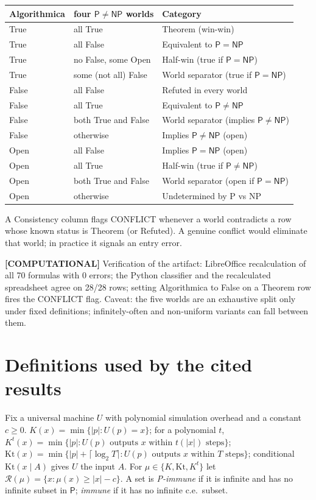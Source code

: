 \documentclass[11pt]{article}
\theoremstyle{remark}
\newcommand{\Kt}{\mathrm{Kt}}
\newcommand{\Kpt}{K^{t}}
\newcommand{\R}{\mathcal{R}}
\newcommand{\cP}{\mathsf{P}}
\newcommand{\NP}{\mathsf{NP}}
\newcommand{\status}[1]{\textbf{[#1]}}
\begin{document}
\begin{center}
\begin{tabular}{lll}
Algorithmica & four $\cP\neq\NP$ worlds & Category \\ \hline
True & all True & Theorem (win-win) \\
True & all False & Equivalent to $\cP=\NP$ \\
True & no False, some Open & Half-win (true if $\cP=\NP$) \\
True & some (not all) False & World separator (true if $\cP=\NP$) \\
False & all False & Refuted in every world \\
False & all True & Equivalent to $\cP\neq\NP$ \\
False & both True and False & World separator (implies $\cP\neq\NP$) \\
False & otherwise & Implies $\cP\neq\NP$ (open) \\
Open & all False & Implies $\cP=\NP$ (open) \\
Open & all True & Half-win (true if $\cP\neq\NP$) \\
Open & both True and False & World separator (open if $\cP=\NP$) \\
Open & otherwise & Undetermined by P vs NP \\
\end{tabular}
\end{center}

A Consistency column flags CONFLICT whenever a world contradicts a row whose known status is Theorem
(or Refuted). A genuine conflict would eliminate that world; in practice it signals an entry error.

\status{COMPUTATIONAL} Verification of the artifact: LibreOffice recalculation of all 70 formulas with
0 errors; the Python classifier and the recalculated spreadsheet agree on 28/28 rows; setting
Algorithmica to False on a Theorem row fires the CONFLICT flag. Caveat: the five worlds are an
exhaustive split only under fixed definitions; infinitely-often and non-uniform variants can fall
between them.

\section{Definitions used by the cited results}

Fix a universal machine $U$ with polynomial simulation overhead and a constant $c\ge 0$.
$K(x)=\min\{|p|:U(p)=x\}$; for a polynomial $t$, $\Kpt(x)=\min\{|p|:U(p)\text{ outputs }x\text{ within }t(|x|)\text{ steps}\}$;
$\Kt(x)=\min\{|p|+\lceil\log_2 T\rceil: U(p)\text{ outputs }x\text{ within }T\text{ steps}\}$;
conditional $\Kt(x\mid A)$ gives $U$ the input $A$.
For $\mu\in\{K,\Kt,\Kpt\}$ let $\R(\mu)=\{x:\mu(x)\ge |x|-c\}$.
A set is \emph{P-immune} if it is infinite and has no infinite subset in $\cP$; \emph{immune} if it has
no infinite c.e.\ subset.
\end{document}
